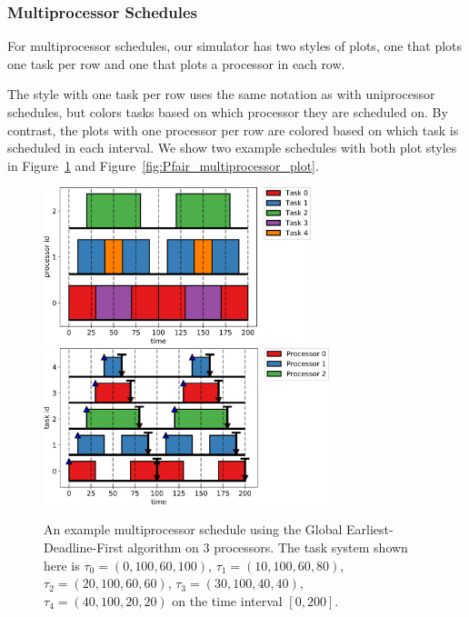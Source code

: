 \documentclass[11pt]{article}
\newcommand{\figref}[1]{Figure~\ref{#1}}
\begin{document}
\subsubsection{Multiprocessor Schedules}

For multiprocessor schedules, our simulator has two styles of plots, one that plots one task per row and one that plots a processor in each row.

The style with one task per row uses the same notation as with uniprocessor schedules, but colors tasks based on which processor they are scheduled on. By contrast, the plots with one processor per row are colored based on which task is scheduled in each interval. We show two example schedules with both plot styles in \figref{fig:EDF_multiprocessor_plot} and \figref{fig:Pfair_multiprocessor_plot}.

\begin{figure}
	\centering
	\phantom{spacing}
	\includegraphics[height=4.55cm]{EDF_multiprocessor_example1_combined.png}\quad
	\includegraphics[height=4.55cm]{EDF_multiprocessor_example2_combined.png}
	\caption{An example multiprocessor schedule using the Global Earliest-Deadline-First algorithm on 3 processors. The task system shown here is $\tau_0 = (0,100,60,100)$, $\tau_1 = (10,100,60,80)$, $\tau_2=(20,100,60,60)$, $\tau_3=(30,100,40,40)$, $\tau_4=(40,100,20,20)$ on the time interval $[0, 200]$.}
	\label{fig:EDF_multiprocessor_plot}
\end{figure}
\end{document}
